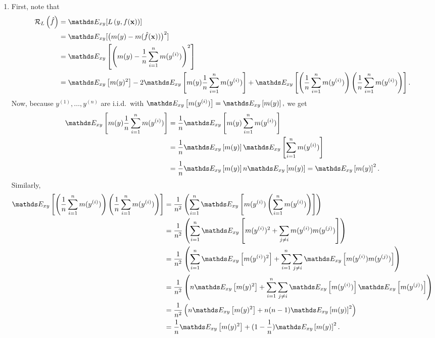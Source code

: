 \documentclass[a4paper]{article}
\begin{document}
{\begin{enumerate}
\item First, note that
%
\begin{align*}
%
  \risk_L\left(\fh \right) 
  &=  \E_{xy} [\Lxy]      \\
  &=   \E_{xy} [ \big(m(y)-m(\fxh)\big)^2 ]      \\
%  
  &=   \E_{xy} \left[ \left(   m(y) -  \frac1n \sum_{i=1}^n m(\yi)    \right)^2 \right]  \\
  &=   \E_{xy} \left[    m(y)^2  \right]  - 2 \E_{xy} \left[    m(y)   \frac1n \sum_{i=1}^n m(\yi)  \right]  +    \E_{xy} \left[ \left(\frac1n \sum_{i=1}^n m(\yi)\right) \left(\frac1n \sum_{i=1}^n m(\yi)\right)   \right] . \\
%
\end{align*}
%
Now, because $y^{(1)},\ldots,y^{(n)}$ are i.i.d.\ with $\E_{xy} \left[ m(\yi) \right] = \E_{xy} \left[  m(y) \right],$ we get
%
\begin{align*}
%	
	\E_{xy} \left[    m(y)   \frac1n \sum_{i=1}^n m(\yi)  \right] 
%	
	&= \frac1n \E_{xy} \left[    m(y)    \sum_{i=1}^n m(\yi)  \right] \\
%	
	&= \frac1n \E_{xy} \left[    m(y)   \right]  \E_{xy} \left[   \sum_{i=1}^n m(\yi)  \right] \\
	&= \frac1n \E_{xy} \left[    m(y)   \right]  n \E_{xy} \left[  m(y) \right] = \E_{xy} \left[  m(y) \right]^2.
%	
\end{align*}
%
Similarly,
%
\begin{align*}
%	
	\E_{xy} \left[ \left(\frac1n \sum_{i=1}^n m(\yi)\right) \left(\frac1n \sum_{i=1}^n m(\yi)\right)   \right]
%	
	&= \frac{1}{n^2} \left(	\sum_{i=1}^n	\E_{xy} \left[   m(\yi)  \left( \sum_{i=1}^n m(\yi)\right)   \right]		\right) \\
%	
	&=  \frac{1}{n^2} \left(	\sum_{i=1}^n	\E_{xy} \left[   m(\yi)^2 + \sum_{j \neq i}  m(\yi) m(y^{(j)})   \right]		\right) \\
	&=  \frac{1}{n^2} \left(\sum_{i=1}^n	\E_{xy} \left[   m(\yi)^2  \right] +  	\sum_{i=1}^n \sum_{j \neq i} \E_{xy} \left[ m(\yi) m(y^{(j)})   \right]		\right) \\
%	
	&=  \frac{1}{n^2} \left( n	\E_{xy} \left[   m(y)^2  \right] +  	\sum_{i=1}^n \sum_{j \neq i} \E_{xy} \left[ m(\yi)  \right]	 \E_{xy} \left[ m(y^{(j)})   \right]		\right) \\
%	
	&=  \frac{1}{n^2} \left( n	\E_{xy} \left[   m(y)^2  \right] +  n(n-1) \E_{xy} \left[  m(y)   \right]^2		\right) \\
	&=  \frac1n	\E_{xy} \left[   m(y)^2  \right] +   (1-\frac1n) \E_{xy} \left[  m(y)   \right]^2	. \\
%	
\end{align*}


\end{enumerate}}
\end{document}
